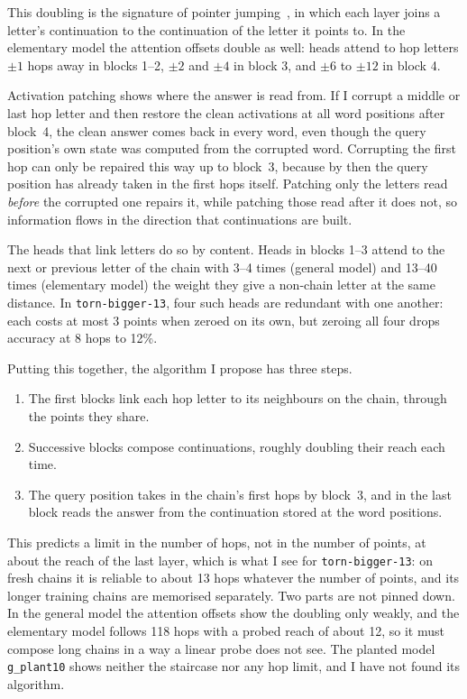 \documentclass[11pt,a4paper]{article}
\newcommand{\tb}{\texttt{torn-bigger-13}}
\begin{document}
This doubling is the signature of pointer jumping~\cite{hillis}, in which each layer joins a letter's continuation to the continuation of the letter it points to. In the elementary model the attention offsets double as well: heads attend to hop letters $\pm1$ hops away in blocks 1--2, $\pm2$ and $\pm4$ in block 3, and $\pm6$ to $\pm12$ in block 4.

Activation patching shows where the answer is read from. If I corrupt a middle or last hop letter and then restore the clean activations at all word positions after block~4, the clean answer comes back in every word, even though the query position's own state was computed from the corrupted word. Corrupting the first hop can only be repaired this way up to block~3, because by then the query position has already taken in the first hops itself. Patching only the letters read \emph{before} the corrupted one repairs it, while patching those read after it does not, so information flows in the direction that continuations are built.

The heads that link letters do so by content. Heads in blocks 1--3 attend to the next or previous letter of the chain with 3--4 times (general model) and 13--40 times (elementary model) the weight they give a non-chain letter at the same distance. In \tb{}, four such heads are redundant with one another: each costs at most 3 points when zeroed on its own, but zeroing all four drops accuracy at 8 hops to 12\%.

Putting this together, the algorithm I propose has three steps.
\begin{enumerate}
  \item The first blocks link each hop letter to its neighbours on the chain, through the points they share.
  \item Successive blocks compose continuations, roughly doubling their reach each time.
  \item The query position takes in the chain's first hops by block~3, and in the last block reads the answer from the continuation stored at the word positions.
\end{enumerate}
This predicts a limit in the number of hops, not in the number of points, at about the reach of the last layer, which is what I see for \tb{}: on fresh chains it is reliable to about 13 hops whatever the number of points, and its longer training chains are memorised separately. Two parts are not pinned down. In the general model the attention offsets show the doubling only weakly, and the elementary model follows 118 hops with a probed reach of about 12, so it must compose long chains in a way a linear probe does not see. The planted model \texttt{g\_plant10} shows neither the staircase nor any hop limit, and I have not found its algorithm.
\end{document}
